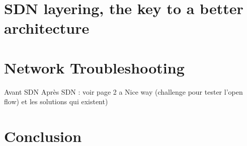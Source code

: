 \documentclass[10pt,article]{IEEEtran}
\begin{document}
\section{SDN layering, the key to a better architecture}

\section{Network Troubleshooting}
Avant SDN
Après SDN : voir page 2 a Nice way (challenge pour tester l'open flow) et les solutions qui existent)

\section{}

\section{Conclusion}


\nocite{*}


\end{document}
